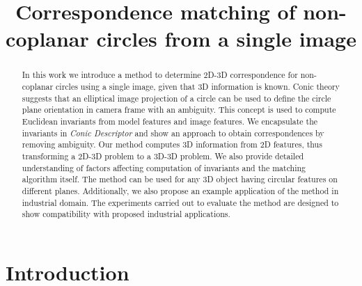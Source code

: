 \documentclass{bmvc2k}
\title{Correspondence matching of non-coplanar circles from a single image}
\begin{document}
\maketitle

\begin{abstract}
In this work we introduce a method to determine 2D-3D correspondence for non-coplanar circles using a single image, given that 
3D information is known. 
Conic theory suggests that an elliptical image projection of a circle can be used to define the circle plane orientation in camera frame with an ambiguity. This concept is used to compute Euclidean invariants from model features and image features. We encapsulate the invariants in \textit{Conic Descriptor} and show an approach to obtain correspondences by removing ambiguity. Our method computes 3D information from 2D features, thus transforming a 2D-3D problem to a 3D-3D problem. 
We also provide detailed understanding of factors affecting computation of invariants and the matching algorithm itself. 
The method can be used for any 3D object having circular features on different planes. Additionally, we also propose an example application of the method in industrial domain. The experiments carried out to evaluate the method are designed to show compatibility with proposed industrial applications. 

\end{abstract}

\section{Introduction}
\label{sec:intro}
\end{document}
